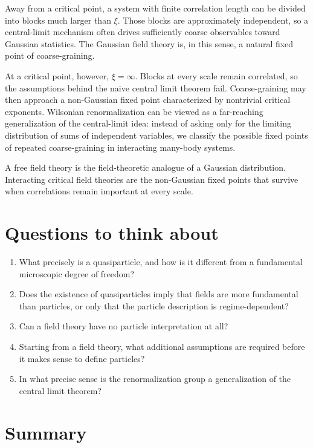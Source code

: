 \documentclass[11pt]{article}
\begin{document}
Away from a critical point, a system with finite correlation length can be divided into blocks much larger than $\xi$.  Those blocks are approximately independent, so a central-limit mechanism often drives sufficiently coarse observables toward Gaussian statistics.  The Gaussian field theory is, in this sense, a natural fixed point of coarse-graining.

At a critical point, however, $\xi=\infty$.  Blocks at every scale remain correlated, so the assumptions behind the naive central limit theorem fail.  Coarse-graining may then approach a non-Gaussian fixed point characterized by nontrivial critical exponents.  Wilsonian renormalization can be viewed as a far-reaching generalization of the central-limit idea: instead of asking only for the limiting distribution of sums of independent variables, we classify the possible fixed points of repeated coarse-graining in interacting many-body systems.

\begin{keyidea}[Preview]
A free field theory is the field-theoretic analogue of a Gaussian distribution.  Interacting critical field theories are the non-Gaussian fixed points that survive when correlations remain important at every scale.
\end{keyidea}

\section{Questions to think about}

\begin{enumerate}
  \item What precisely is a quasiparticle, and how is it different from a fundamental microscopic degree of freedom?
  \item Does the existence of quasiparticles imply that fields are more fundamental than particles, or only that the particle description is regime-dependent?
  \item Can a field theory have no particle interpretation at all?
  \item Starting from a field theory, what additional assumptions are required before it makes sense to define particles?
  \item In what precise sense is the renormalization group a generalization of the central limit theorem?
\end{enumerate}

\enlargethispage{2\baselineskip}
\section*{Summary}
\end{document}
